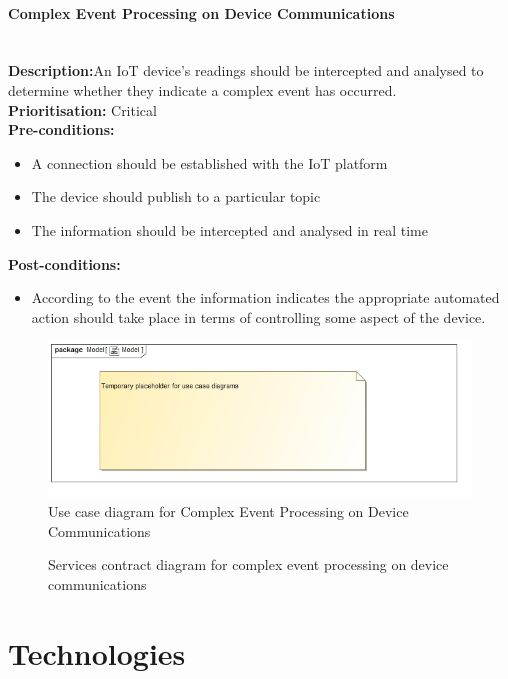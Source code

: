 \documentclass{article}
\begin{document}
	\paragraph{Complex Event Processing on Device Communications}\mbox{}\\
		\textbf{Description:}An IoT device's readings should be intercepted and analysed to determine whether they indicate a complex event has occurred.\\
		\textbf{Prioritisation:} Critical\\		
		\textbf{Pre-conditions:}
			\begin{itemize}
				\item A connection should be established with the IoT platform
				\item The device should publish to a particular topic
				\item The information should be intercepted and analysed in real time
			\end{itemize}
		\textbf{Post-conditions:}
			\begin{itemize}
				\item According to the event the information indicates the appropriate automated action should take place in terms of controlling some aspect of the device.
			\end{itemize}

		\begin{figure}[H]
			\includegraphics[width=\linewidth]{images/tempUseCase.jpg}
			\caption{Use case diagram for Complex Event Processing on Device Communications}
		\end{figure}
		
		\begin{figure}[H]
			\caption{Services contract diagram for complex event processing on device communications}
		\end{figure}	
	
\section{Technologies}
\end{document}
